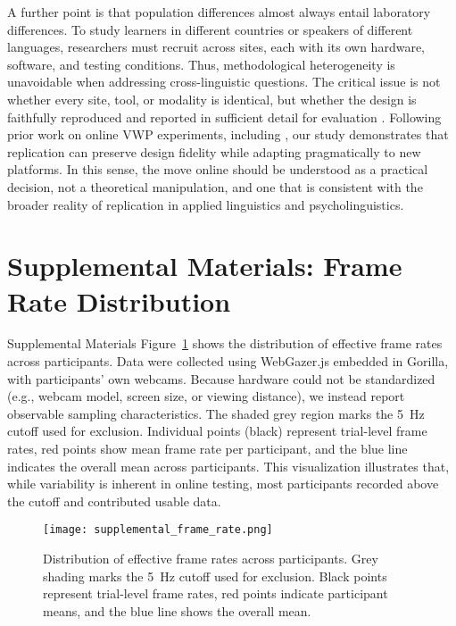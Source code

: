 \documentclass[sn-apa]{sn-jnl} %
\begin{document}
A further point is that population differences almost always entail laboratory
differences. To study learners in different countries or speakers of different
languages, researchers must recruit across sites, each with its own hardware,
software, and testing conditions. Thus, methodological heterogeneity is
unavoidable when addressing cross-linguistic questions. The critical issue is
not whether every site, tool, or modality is identical, but whether the design
is faithfully reproduced and reported in sufficient detail for evaluation
\parencite{mcmanus2024}. Following prior work on online VWP experiments,
including \textcite{bramlett2023}, our study demonstrates that replication can
preserve design fidelity while adapting pragmatically to new platforms. In this
sense, the move online should be understood as a practical decision, not a theoretical manipulation, and one that is consistent with the broader reality of replication in applied linguistics and psycholinguistics.


\section*{Supplemental Materials: Frame Rate Distribution}

\noindent
Supplemental Materials Figure~\ref{fig:frame_rate} shows the distribution of effective frame rates across participants. Data were collected using 
WebGazer.js embedded in Gorilla, with participants’ own webcams. Because hardware could not be standardized (e.g., webcam model, screen size, or viewing 
distance), we instead report observable sampling characteristics. The shaded grey region marks the 5~Hz cutoff used for exclusion. Individual points (black) 
represent trial-level frame rates, red points show mean frame rate per participant, and the blue line indicates the overall mean across participants. This visualization illustrates that, while variability is inherent in online testing, most participants recorded above the cutoff and contributed usable data.

\begin{figure}[h]
    \centering
    \texttt{[image: supplemental\_frame\_rate.png]}
    \caption{Distribution of effective frame rates across participants. Grey 
    shading marks the 5~Hz cutoff used for exclusion. Black points represent 
    trial-level frame rates, red points indicate participant means, and the 
    blue line shows the overall mean.}
    \label{fig:frame_rate}
\end{figure}
\end{document}
